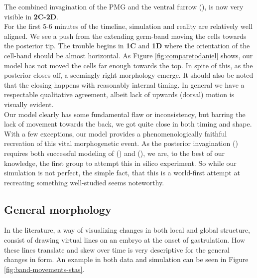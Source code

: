 The combined invagination of the PMG and the ventral furrow (), is now very visible in \textbf{2C-}\textbf{2D}.\\
For the first 5-6 minutes of the timeline, simulation and reality are relatively well aligned. We see a push from the extending germ-band moving the cells towards the posterior tip. The trouble begins in \textbf{1C} and \textbf{1D} where the orientation of the cell-band should be almost horizontal. As Figure \ref{fig:comparetodaniel} shows, our model has not moved the cells far enough towards the top. In spite of this, as the posterior closes off, a seemingly right morphology emerge. It should also be noted that the closing happens with reasonably internal timing. In general we have a respectable qualitative agreement, albeit lack of upwards (dorsal) motion is visually evident.\\



Our model clearly has some fundamental flaw or inconsistency, but barring the lack of movement towards the back, we got quite close in both timing and shape. With a few exceptions, our model provides a phenomenologically faithful recreation of this vital morphogenetic event.
As the posterior invagination () requires both successful modeling of () and (), we are, to the best of our knowledge, the first group to attempt this in silico experiment. So while our simulation is not perfect, the simple fact, that this is a world-first attempt at recreating something well-studied seems noteworthy.\\

 

\subsection{General morphology}
In the literature, a way of visualizing changes in both local and global structure, consist of drawing virtual lines on an embryo at the onset of gastrulation. How these lines translate and skew over time is very descriptive for the general changes in form. An example in both data and simulation can be seen in Figure \ref{fig:band-movements-stas}.

